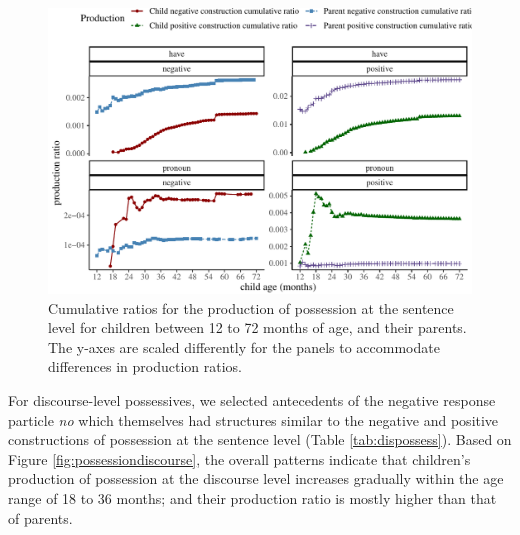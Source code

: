 \documentclass[
  man,floatsintext]{apa6}
\begin{document}
\begin{figure}[H]

{\centering \includegraphics{neg_construction_article_files/figure-latex/possession-1} 

}

\caption{Cumulative ratios for the production of possession at the sentence level for children between 12 to 72 months of age, and their parents. The y-axes are scaled differently for the panels to accommodate differences in production ratios.}\label{fig:possession}
\end{figure}

For discourse-level possessives, we selected antecedents of the negative response particle \emph{no} which themselves had structures similar to the negative and positive constructions of possession at the sentence level (Table \ref{tab:dispossess}). Based on Figure \ref{fig:possessiondiscourse}, the overall patterns indicate that children's production of possession at the discourse level increases gradually within the age range of 18 to 36 months; and their production ratio is mostly higher than that of parents.
\end{document}

